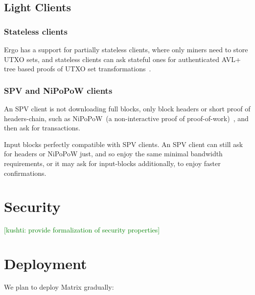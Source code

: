 \documentclass{llncs}
\newcommand{\protname}{\textsf{Matrix}}
\newcommand{\knote}[1]{{\textcolor{green}{[kushti: #1]}}}
\begin{document}
\subsection{Light Clients}
\label{sec:light-clients}

\subsubsection{Stateless clients}
\label{subsec:stateless-clients}

Ergo has a support for partially stateless clients, where only miners need to store UTXO sets, and stateless clients
can ask stateful ones for authenticated AVL+ tree based proofs of UTXO set transformations~\cite{reyzin2017improving}.


\subsubsection{SPV and NiPoPoW clients}
\label{subsec:spv-nipopow-clients}

An SPV client is not downloading full blocks, only block headers or short proof of headers-chain, such as NiPoPoW~(a
non-interactive proof of proof-of-work)~\cite{kiayias2020non}, and then ask for transactions.

Input blocks perfectly compatible with SPV clients. An SPV client can still ask for headers or NiPoPoW just, and so enjoy
the same minimal bandwidth requirements, or it may ask for input-blocks additionally, to enjoy faster confirmations.


\section{Security}
\label{sec:security}

\knote{provide formalization of security properties}


\section{Deployment}
\label{sec:deployment}

We plan to deploy \protname{} gradually:
\end{document}
